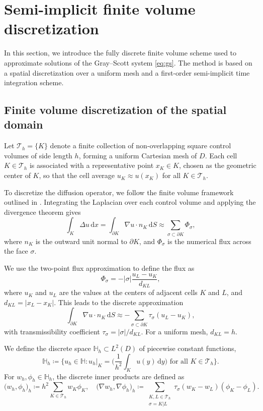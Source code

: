 \documentclass[11pt, a4paper]{amsart}
\newcommand{\dd}{\,\mathrm{d}}
\newcommand{\mT}{\mathcal{T}}
\newcommand{\HH}{\mathbb{H}}
\numberwithin{equation}{section}
\begin{document}
	
	\section{Semi-implicit finite volume discretization}\label{sec:discretization}
	
	In this section, we introduce the fully discrete finite volume scheme used to approximate solutions of the Gray--Scott system \eqref{eq:gs}. The method is based on a spatial discretization over a uniform mesh and a first-order semi-implicit time integration scheme.
	
	\subsection{Finite volume discretization of the spatial domain}\label{subsec:mesh}

	Let $\mT_h = \{K\}$ denote a finite collection of non-overlapping square control volumes of side length $h$, forming a uniform Cartesian mesh of $D$. Each cell $K \in \mathcal{T}_h$  is associated with a representative point $x_K \in K$, chosen as the geometric center of $K$, so that the cell average $u_K \approx u(x_K)$ for all $K \in \mathcal{T}_h$.
	
	To discretize the diffusion operator, we follow the finite volume framework outlined in \cite{eymard2000finite}. 
	Integrating the Laplacian over each control volume and applying the divergence theorem gives
	\[
	\int_K \Delta u \dd x = \int_{\partial K} \nabla u \cdot n_K \dd S \approx \sum_{\sigma \subset \partial K} \Phi_\sigma,
	\]
	where $n_K$ is the outward unit normal to $\partial K$, and $\Phi_\sigma$ is the numerical flux across the face $\sigma$. 
	
	We use the two-point flux approximation to define the flux as
	\[
	\Phi_\sigma = - \vert \sigma\vert \frac{u_L - u_K}{d_{KL}},
	\]
	where $u_K$ and $u_L$ are the values at the centers of adjacent cells $K$ and $L$, and $d_{KL} = \vert x_L - x_K\vert$. This leads to the discrete approximation
	\[
	\int_{\partial K} \nabla u \cdot n_K \dd S \approx - \sum_{\sigma \subset \partial K} \tau_\sigma (u_L - u_K),
	\]
	with transmissibility coefficient $\tau_\sigma =  {\vert\sigma\vert}/{d_{KL}}$. For a uniform mesh, $d_{KL} = h$.
	
	We define the discrete space $\HH_h \subset L^2(D)$ of piecewise constant functions,
	\[
	\HH_h \coloneqq \bigg\{ u_h \in\HH: u_h|_K = \bigg(\frac{1}{h^2}\int_K u(y)\dd y\bigg) \text{ for all } K \in \mathcal{T}_h\bigg \}.
	\]
	For $w_h, \phi_h \in \HH_h$, the discrete inner products are defined as 
	\[
	\big(w_h, \phi_h\big)_h \coloneqq h^2 \sum_{K \in \mathcal{T}_h} w_K \phi_K,\quad
	\big(\nabla w_h, \nabla \phi_h\big)_h \coloneqq \sum_{\substack{K, L \in \mathcal{T}_h \\ \sigma = K|L}} \tau_{\sigma} (w_K - w_L)(\phi_K - \phi_L).
	\]
	
\end{document}
